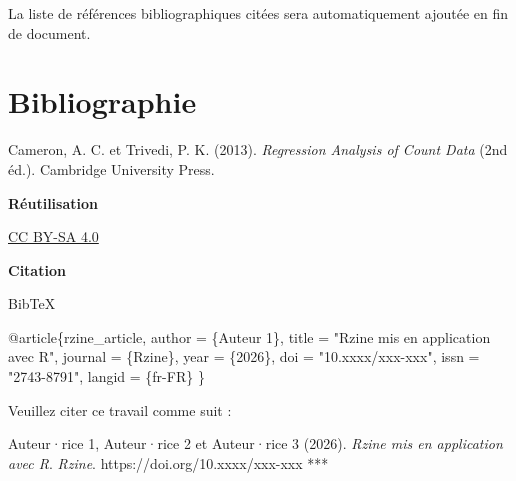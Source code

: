 \documentclass[
  french,
  11pt,
  a4paper,
]{article}
\newenvironment{Shaded}{\begin{snugshade}}{\end{snugshade}}
\newcommand{\DataTypeTok}[1]{\textcolor[rgb]{0.68,0.00,0.00}{#1}}
\newcommand{\NormalTok}[1]{\textcolor[rgb]{0.00,0.23,0.31}{#1}}
\newcommand{\OtherTok}[1]{\textcolor[rgb]{0.00,0.23,0.31}{#1}}
\newcommand{\StringTok}[1]{\textcolor[rgb]{0.13,0.47,0.30}{#1}}
\newcommand{\VariableTok}[1]{\textcolor[rgb]{0.07,0.07,0.07}{#1}}
\newlength{\cslhangindent}
\newenvironment{CSLReferences}[2] %
 {\begin{list}{}{%
  \setlength{\itemindent}{0pt}
  \setlength{\leftmargin}{0pt}
  \setlength{\parsep}{0pt}
  \ifodd #1
   \setlength{\leftmargin}{\cslhangindent}
   \setlength{\itemindent}{-1\cslhangindent}
  \fi
  \setlength{\itemsep}{#2\baselineskip}}}
 {\end{list}}
\begin{document}
La liste de références bibliographiques citées sera automatiquement
ajoutée en fin de document.

\section*{Bibliographie}\label{bibliographie}

\label{refs}
\begin{CSLReferences}{1}{0}
Cameron, A. C. et Trivedi, P. K. (2013). \emph{Regression Analysis of
Count Data} (2nd éd.). Cambridge University Press.

\end{CSLReferences}

\textbf{Réutilisation}

\href{https://creativecommons.org/licenses/by-sa/4.0/deed.en}{CC BY-SA
4.0}

\textbf{Citation}

BibTeX

\begin{Shaded}
\begin{Highlighting}[]
\VariableTok{@article}\NormalTok{\{}\OtherTok{rzine\_article}\NormalTok{,}
  \DataTypeTok{author}\NormalTok{ = \{Auteur 1\},}
  \DataTypeTok{title}\NormalTok{ = "}\StringTok{Rzine mis en application avec R}\NormalTok{",}
  \DataTypeTok{journal}\NormalTok{ = \{Rzine\},}
  \DataTypeTok{year}\NormalTok{ = \{2026\},}
  \DataTypeTok{doi}\NormalTok{ = "}\StringTok{10.xxxx/xxx{-}xxx}\NormalTok{",}
  \DataTypeTok{issn}\NormalTok{ = "}\StringTok{2743{-}8791}\NormalTok{",}
  \DataTypeTok{langid}\NormalTok{ = \{fr{-}FR\}}
\NormalTok{\}}
\end{Highlighting}
\end{Shaded}

Veuillez citer ce travail comme suit :

Auteur·rice 1, Auteur·rice 2 et Auteur·rice 3 (2026). \emph{Rzine mis en
application avec R}. \emph{Rzine}. https://doi.org/10.xxxx/xxx-xxx ***
\end{document}
